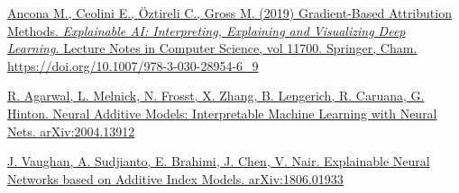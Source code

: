 \documentclass[conference]{report}
\begin{document}
\begin{thebibliography}{1}
\href{run:https://link.springer.com/chapter/10.1007/978-3-030-28954-6_9}{Ancona M., Ceolini E., Öztireli C., Gross M. (2019) Gradient-Based Attribution Methods. \emph{Explainable AI: Interpreting, Explaining and Visualizing Deep Learning.} Lecture Notes in Computer Science, vol 11700. Springer, Cham. https://doi.org/10.1007/978-3-030-28954-6\_9}

\href{run:https://link.springer.com/chapter/10.1007/978-3-030-28954-6_9}{R. Agarwal, L. Melnick, N. Frosst, X. Zhang, B. Lengerich, R. Caruana, G. Hinton. Neural Additive Models:
Interpretable Machine Learning with Neural Nets. arXiv:2004.13912}

\href{run:https://link.springer.com/chapter/10.1007/978-3-030-28954-6_9}{J. Vaughan, A. Sudjianto, E. Brahimi, J. Chen, V. Nair. Explainable Neural Networks based on Additive Index Models. arXiv:1806.01933}




\end{thebibliography}
\end{document}
